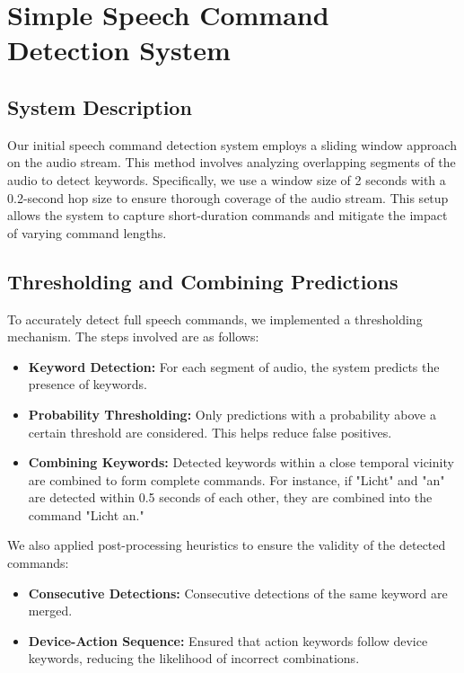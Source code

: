 \section{Simple Speech Command Detection System}
\subsection{System Description}
Our initial speech command detection system employs a sliding window approach on the audio stream.
This method involves analyzing overlapping segments of the audio to detect keywords.
Specifically, we use a window size of 2 seconds with a 0.2-second hop size to ensure thorough coverage of the audio stream.
This setup allows the system to capture short-duration commands and mitigate the impact of varying command lengths.

\subsection{Thresholding and Combining Predictions}
To accurately detect full speech commands, we implemented a thresholding mechanism.
The steps involved are as follows:

\begin{itemize}
  \item \textbf{Keyword Detection:} For each segment of audio, the system predicts the presence of keywords.
  \item \textbf{Probability Thresholding:} Only predictions with a probability above a certain threshold are considered. This helps reduce false positives.
  \item \textbf{Combining Keywords:} Detected keywords within a close temporal vicinity are combined to form complete commands. For instance, if "Licht" and "an" are detected within 0.5 seconds of each other, they are combined into the command "Licht an."
\end{itemize}
We also applied post-processing heuristics to ensure the validity of the detected commands:
\begin{itemize}
  \item \textbf{Consecutive Detections:} Consecutive detections of the same keyword are merged.
  \item \textbf{Device-Action Sequence:} Ensured that action keywords follow device keywords, reducing the likelihood of incorrect combinations.

\end{itemize}

